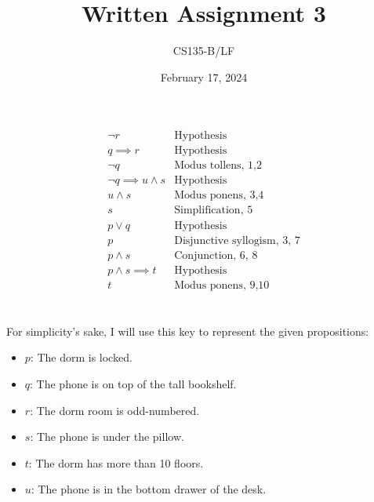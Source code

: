 \documentclass{article}
\title{Written Assignment 3}
\author{CS135-B/LF}
\date{February 17, 2024}
\begin{document}
\maketitle

\section{}
\begin{align}
     & \neg r                    & \text{Hypothesis}                  & \\
     & q \implies r              & \text{Hypothesis}                  & \\
     & \neg q                    & \text{Modus tollens, 1,2}          & \\
     & \neg q \implies u \land s & \text{Hypothesis}                  & \\
     & u \land s                 & \text{Modus ponens, 3,4}           & \\
     & s                         & \text{Simplification, 5}           & \\
     & p \lor q                  & \text{Hypothesis}                  & \\
     & p                         & \text{Disjunctive syllogism, 3, 7} & \\
     & p \land s                 & \text{Conjunction, 6, 8}           & \\
     & p \land s \implies t      & \text{Hypothesis}                  & \\
     & t                         & \text{Modus ponens, 9,10}          &
\end{align}

\section{}

For simplicity's sake, I will use this key to represent the given propositions:
\begin{itemize}
    \item $p$: The dorm is locked.
    \item $q$: The phone is on top of the tall bookshelf.
    \item $r$: The dorm room is odd-numbered.
    \item $s$: The phone is under the pillow.
    \item $t$: The dorm has more than 10 floors.
    \item $u$: The phone is in the bottom drawer of the desk.
\end{itemize}
\end{document}
